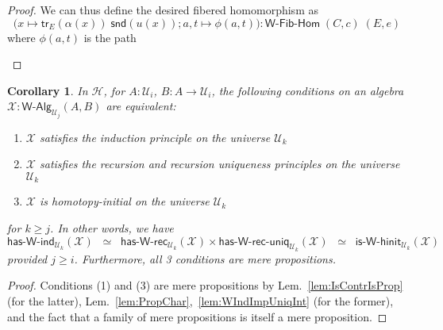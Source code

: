 \documentclass[11pt]{article}
\newcommand{\X}{\mathcal{X}}
\newcommand{\fst}{\mathsf{fst}}
\newcommand{\snd}{\mathsf{snd}}
\newcommand{\lam}[1]{\lambda_{#1}}
\newcommand{\refl}{\mathsf{refl}}
\newcommand{\W}{\mathsf{W}}
\newcommand{\funext}{\leftidx{^\Pi}{\mathsf{Eq}}^{=}}
\newcommand{\happly}{\leftidx{^=}{\mathsf{Eq}}^{\Pi}}
\newcommand{\idtodpair}{\leftidx{^=}{\mathsf{Eq}}^{\Sigma}}
\newcommand{\UU}{\mathcal{U}}
\newcommand{\WAlg}{\mathsf{W}\text{-}\mathsf{Alg}}
\newcommand{\WFibHom}{\mathsf{W}\text{-}\mathsf{Fib}\text{-}\mathsf{Hom}}
\newcommand{\HasWRec}{\mathsf{has}\text{-}\mathsf{W}\text{-}\mathsf{rec}}
\newcommand{\HasWInd}{\mathsf{has}\text{-}\mathsf{W}\text{-}\mathsf{ind}}
\newcommand{\HasWRecUniq}{\mathsf{has}\text{-}\mathsf{W}\text{-}\mathsf{rec}\text{-}\mathsf{uniq}}
\newcommand{\IsWHInit}{\mathsf{is}\text{-}\mathsf{\W}\text{-}\mathsf{hinit}}
\newcommand{\app}{\mathsf{ap}}
\newcommand{\trans}{\mathsf{tr}}
\newcommand{\Hint}{\mathcal{H}}
\newcommand{\ct}{%
  \mathchoice{\mathbin{\raisebox{0.5ex}{$\displaystyle\centerdot$}}}%
             {\mathbin{\raisebox{0.5ex}{$\centerdot$}}}%
             {\mathbin{\raisebox{0.25ex}{$\scriptstyle\,\centerdot\,$}}}%
             {\mathbin{\raisebox{0.1ex}{$\scriptscriptstyle\,\centerdot\,$}}}}
\newtheorem{corollary}[theorem]{Corollary}
\theoremstyle{definition}
\begin{document}
\begin{proof}
We can thus define the desired fibered homomorphism as \[\Big(x \mapsto \trans_E(\alpha(x)) \; \snd(u(x)); a,t \mapsto \phi(a,t) \Big) : \WFibHom \; (C,c) \; (E,e)\]
where $\phi(a,t)$ is the path
\begin{center}
\end{center}
\end{proof}

\begin{corollary}\label{lem:WMainInt}
In $\Hint$, for $A:\UU_i$, $B : A \to \UU_i$, the following conditions on an algebra $\X : \WAlg_{\UU_j}(A,B)$ are equivalent:
\begin{enumerate}
\item $\X$ satisfies the induction principle on the universe $\UU_k$
\item $\X$ satisfies the recursion and recursion uniqueness principles on the universe $\UU_k$
\item $\X$ is homotopy-initial on the universe $\UU_k$  
\end{enumerate}
for $k \geq j$. In other words, we have \[ \HasWInd_{\UU_k}(\X)  \;\; \simeq \;\; \HasWRec_{\UU_k}(\X) \times \HasWRecUniq_{\UU_k}(\X) \;\; \simeq \;\; \IsWHInit_{\UU_k}(\X) \]
provided $j \geq i$. Furthermore, all 3 conditions are mere propositions.
\end{corollary}
\begin{proof}
Conditions (1) and (3) are mere propositions by Lem.~\ref{lem:IsContrIsProp} (for the latter), Lem.~\ref{lem:PropChar},~\ref{lem:WIndImpUniqInt} (for the former), and the fact that a family of mere propositions is itself a mere proposition.
\end{proof}
\end{document}
